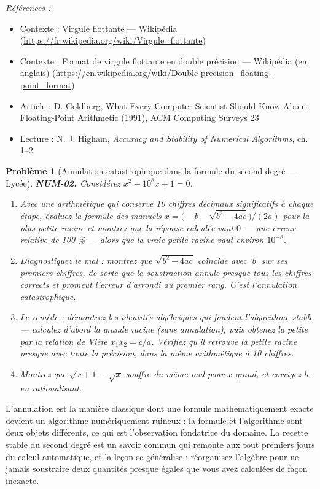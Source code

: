 \documentclass[11pt]{article}
\newtheorem{problem}{Problème}
\newenvironment{refs}{\par\small\noindent\emph{Références :}\begin{itemize}\setlength\itemsep{0pt}}{\end{itemize}\normalsize}
\begin{document}
\begin{refs}
\item Contexte : Virgule flottante --- Wikipédia (\url{https://fr.wikipedia.org/wiki/Virgule_flottante})
\item Contexte : Format de virgule flottante en double précision --- Wikipédia (en anglais) (\url{https://en.wikipedia.org/wiki/Double-precision_floating-point_format})
\item Article : D. Goldberg, \og{} What Every Computer Scientist Should Know About Floating-Point Arithmetic \fg{} (1991), ACM Computing Surveys 23
\item Lecture : N. J. Higham, \textit{Accuracy and Stability of Numerical Algorithms}, ch. 1--2
\end{refs}

\bigskip

\begin{problem}[{Annulation catastrophique dans la formule du second degré --- Lycée}]
\textbf{NUM-02.} Considérez $x^2 - 10^8 x + 1 = 0$.
\begin{enumerate}
\item[(a)] Avec une
arithmétique qui conserve 10 chiffres décimaux significatifs à chaque étape, évaluez
la formule des manuels $x = \big(-b - \sqrt{b^2 - 4ac}\big)/(2a)$ pour la plus petite
racine et montrez que la réponse calculée vaut $0$ --- une erreur relative de 100 \% ---
alors que la vraie petite racine vaut environ $10^{-8}$.
\item[(b)] Diagnostiquez le mal : montrez que
$\sqrt{b^2 - 4ac}$ coïncide avec $|b|$ sur ses premiers chiffres, de sorte que la
soustraction annule presque tous les chiffres corrects et promeut l'erreur d'arrondi
au premier rang. C'est l'\textit{annulation catastrophique}.
\item[(c)] Le remède : démontrez les identités algébriques
qui fondent l'algorithme stable --- calculez d'abord la grande racine (sans annulation),
puis obtenez la petite par la relation de Viète $x_1 x_2 = c/a$. Vérifiez qu'il
retrouve la petite racine presque avec toute la précision, dans la même arithmétique
à 10 chiffres.
\item[(d)] Montrez que
$\sqrt{x+1} - \sqrt{x}$ souffre du même mal pour $x$ grand, et corrigez-le en
rationalisant.
\end{enumerate}

\end{problem}

\noindent L'annulation est la manière classique dont une formule
mathématiquement exacte devient un algorithme numériquement ruineux : la formule et
l'algorithme sont deux objets différents, ce qui est l'observation fondatrice du
domaine. La recette stable du second degré est un savoir commun qui remonte aux
tout premiers jours du calcul automatique, et la leçon se généralise : réorganisez
l'algèbre pour ne jamais soustraire deux quantités presque égales que vous avez
calculées de façon inexacte.
\end{document}

